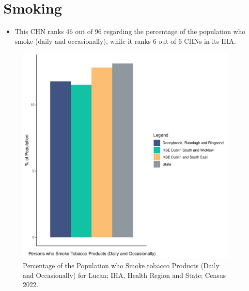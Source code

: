 \documentclass{article}
\begin{document}
\pagebreak

\section{Smoking}\label{sect:Smoking}
\begin{itemize}
\item This CHN ranks  46 out of 96 regarding the percentage of the population who smoke (daily and occasionally), while it ranks   6 out of 6 CHNs in its IHA.
\end{itemize}
\begin{figure}[H]
	\centering
	\includegraphics[width = 120mm]{../figures/SmokingED.pdf}
	\caption{Percentage of the Population who Smoke tobacco Products (Daily and Occasionally) for Lucan; IHA, Health Region and State; Census 2022.}
	\label{fig:2ae19629-1a6a-13a3-e055-000000000001}
	\end{figure}
	
\end{document}

